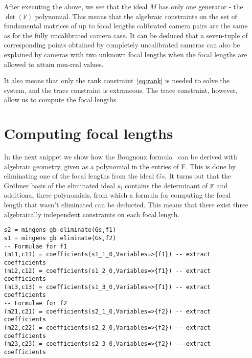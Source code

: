 After executing the above, we see that the ideal $M$ has only one generator - the $\det(\mathtt{F})$ polynomial. This means that the algebraic constraints on the set of fundamental matrices of up to focal lengths calibrated camera pairs are the same as for the fully uncalibrated camera case. It can be deduced that a seven-tuple of corresponding points obtained by completely uncalibrated cameras  can  also  be  explained  by  cameras  with  two  unknown focal lengths when the focal lengths are allowed to attain non-real values.

It also means that only the rank constraint~\ref{eq:rank} is needed to solve the system, and the trace constraint is extraneous. The trace constraint, however, allow us to compute the focal lengths.

\section{Computing focal lengths}
\label{sec:focalformulae}
In the next snippet we show how the Bougnoux formula~\cite{Bougnoux} can be derived with algebraic geometry, given as a polynomial in the entries of F. This is done by eliminating one of the focal lengths from the ideal $Gs$. It turns out that the Gr\"obner basis of the eliminated ideal $s_i$ contains the determinant of $\mathtt{F}$ and additional three polynomials, from which a formula for computing the focal length that wasn't eliminated can be deducted. This means that there exist three algebraically independent constraints on each focal length.

\begin{verbatim}
s2 = mingens gb eliminate(Gs,f1)
s1 = mingens gb eliminate(Gs,f2)
-- Formulae for f1
(m11,c11) = coefficients(s1_1_0,Variables=>{f1}) -- extract coefficients 
(m12,c12) = coefficients(s1_2_0,Variables=>{f1}) -- extract coefficients
(m13,c13) = coefficients(s1_3_0,Variables=>{f1}) -- extract coefficients
-- Formulae for f2
(m21,c21) = coefficients(s2_1_0,Variables=>{f2}) -- extract coefficients 
(m22,c22) = coefficients(s2_2_0,Variables=>{f2}) -- extract coefficients
(m23,c23) = coefficients(s2_3_0,Variables=>{f2}) -- extract coefficients
\end{verbatim}

